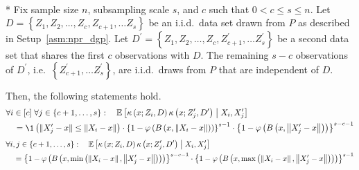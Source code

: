 \newpage
\begin{lem}[]\label{lem:double_cond2}\mbox{}\\*
    Fix sample size $n$, subsampling scale $s$, and $c$ such that $0 < c \leq s \leq n$.
	Let $D = \left\{Z_1, Z_2, \dotsc, Z_c, Z_{c+1}, \dotsc Z_s \right\}$ be an i.i.d.\ data set drawn from $P$ as described in Setup~\ref{asm:npr_dgp}.
	Let $D^{\prime} = \left\{Z_1, Z_2, \dotsc, Z_c, Z_{c+1}^{\prime}, \dotsc Z_s^{\prime} \right\}$ be a second data set that shares the first $c$ observations with $D$.
	The remaining $s - c$ observations of $D^{\prime}$, i.e.\ $\left\{Z_{c+1}^{\prime}, \dotsc Z_s^{\prime} \right\}$, are i.i.d.\ draws from $P$ that are independent of $D$.

    Then, the following statements hold.
    \begin{equation}
        \begin{aligned}
            & \forall i \in [c] \; \forall j \in \{c+1, \dotsc, s\}: \quad
            \E\left[\kappa\left(x; Z_{i}, D\right)\kappa\left(x; Z_{j}^{\prime}, D^{\prime}\right) \; \middle| \; X_i, X_{j}^{\prime}\right]\\
            & \quad = \1\left(\|X_{j}^{\prime} - x\| \leq \|X_{i} - x\|\right)
            \cdot \left\{1-\varphi\left(B\left(x,\left\|X_{i}-x\right\|\right)\right)\right\}^{s-1} 
            \cdot \left\{1-\varphi\left(B\left(x,\left\|X_{j}^{\prime}-x\right\|\right)\right)\right\}^{s-c-1}
        \end{aligned}
    \end{equation}
    \begin{equation}
        \begin{aligned}
            & \forall i,j \in \{c+1, \dotsc, s\}: \quad
            \mathbb{E}\left[\kappa\left(x; Z_{i}, D\right)\kappa\left(x; Z_{j}^{\prime}, D^{\prime}\right) \; \middle| \; X_{i}, X_{j}^{\prime}\right] \\ 
            & \quad = \left\{1-\varphi\left(B\left(x, \min\left(\left\|X_{i} - x\right\|, \left\|X_{j}^{\prime}-x\right\|\right)\right)\right)\right\}^{s-c-1}
            \cdot \left\{1-\varphi\left(B\left(x,\max\left(\left\|X_{i} - x\right\|, \left\|X_{j}^{\prime}-x\right\|\right)\right)\right)\right\}^{s-1}
        \end{aligned}
    \end{equation}
\end{lem}

